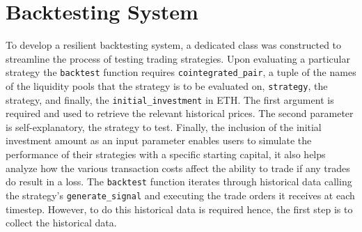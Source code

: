 \section{Backtesting System}

To develop a resilient backtesting system, a dedicated class was constructed to streamline the process of testing trading strategies. Upon evaluating a particular strategy the \texttt{backtest} function requires \texttt{cointegrated\_pair}, a tuple of the names of the liquidity pools that the strategy is to be evaluated on, \texttt{strategy}, the strategy, and finally, the \texttt{initial\_investment} in ETH. The first argument is required and used to retrieve the relevant historical prices. The second parameter is self-explanatory, the strategy to test. Finally, the inclusion of the initial investment amount as an input parameter enables users to simulate the performance of their strategies with a specific starting capital, it also helps analyze how the various transaction costs affect the ability to trade if any trades do result in a loss. The \texttt{backtest} function iterates through historical data calling the strategy's \texttt{generate\_signal} and executing the trade orders it receives at each timestep. However, to do this historical data is required hence, the first step is to collect the historical data.

